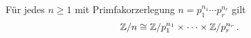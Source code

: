 \begin{corollary}
  Für jedes $n \geq 1$ mit Primfakorzerlegung $n = p_1^{n_1} \dotsm p_r^{n_r}$ gilt
  \[
          \mathbb{Z}/n
    \cong \mathbb{Z}/p_1^{n_1} \times \dotsb \times \mathbb{Z}/p_r^{n_r} \,.
  \]
\end{corollary}















